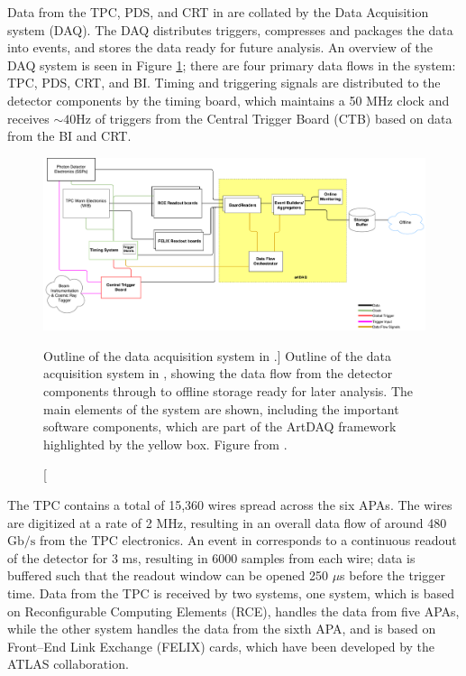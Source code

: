Data from the TPC, PDS, and CRT in \protodune{} are collated by the Data 
Acquisition system (DAQ). The DAQ distributes triggers, compresses and packages 
the data into events, and stores the data ready for future analysis. 
An overview of the \protodune{} DAQ system is seen in Figure 
\ref{fig:pdsp_daq}; there are four primary data flows in the system: TPC, PDS, 
CRT, and BI. Timing and triggering signals are distributed to the detector 
components by the timing board, which maintains a 50 MHz clock and receives 
$\sim 40 \mbox{Hz}$ of triggers from the Central Trigger Board (CTB) based on 
data from the BI and CRT\cite{Abi:2017aow}.

\begin{figure}

	\centering

	\includegraphics[width=\textwidth]{figures/pdsp_daq.pdf}

	\caption
	[Outline of the data acquisition system in \protodune{}.]
	{Outline of the data acquisition system in \protodune{}, showing the data flow
	from the detector components through to offline storage ready for later
	analysis. The main elements of the system are shown, including the important 
	software components, which are part of the ArtDAQ framework highlighted by 
	the yellow box. Figure from \cite{Abi:2017aow}.}

	\label{fig:pdsp_daq}

\end{figure}

The \protodune{} TPC contains a total of 15,360 wires spread across the six
APAs. The wires are digitized at a rate of 2 MHz, resulting in an overall data
flow of around 480 $\mbox{Gb/s}$ from the TPC electronics. An event in
\protodune{} corresponds to a continuous readout of the detector for 3 ms,
resulting in 6000 samples from each wire; data is buffered such that the readout
window can be opened 250 $\mu$s before the trigger time. Data from the TPC is
received by two systems, one system, which is based on Reconfigurable Computing Elements
(RCE)\cite{7431254}, handles the data from five APAs, while the other system
handles the data from the sixth APA, and is based on Front--End Link Exchange 
(FELIX) cards, which have been developed by the ATLAS 
collaboration\cite{Anderson_2016}.

